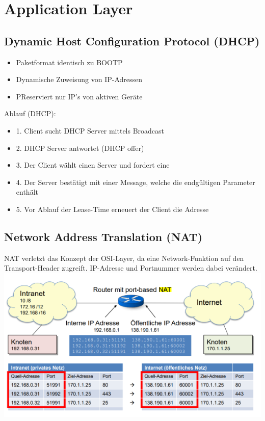 \vfill\null
\columnbreak
\section{Application Layer}

 {

  \subsection{Dynamic Host Configuration Protocol (DHCP)}{
      {
              \begin{itemize}[noitemsep]
                  \item Paketformat identisch zu BOOTP
                  \item Dynamische Zuweisung von IP-Adressen
                  \item PReserviert nur IP’s von aktiven Geräte

              \end{itemize}}

          {Ablauf (DHCP):
              \begin{itemize}[noitemsep]
                  \item 1. Client sucht DHCP Server mittels Broadcast
                  \item 2. DHCP Server antwortet (DHCP offer)
                  \item 3. Der Client wählt einen Server und fordert eine
                  \item 4. Der Server bestätigt mit einer Message, welche die endgültigen Parameter enthält
                  \item 5. Vor Ablauf der Lease-Time erneuert der Client die
                        Adresse
              \end{itemize}
          }

  }


  \subsection{Network Address Translation (NAT)}
  {
      NAT verletzt das Konzept der OSI-Layer, da eine Network-Funktion auf den Transport-Header
      zugreift. IP-Adresse und Portnummer werden dabei verändert.}
  \includegraphics[scale=.45]{img/NAT.png}

}
